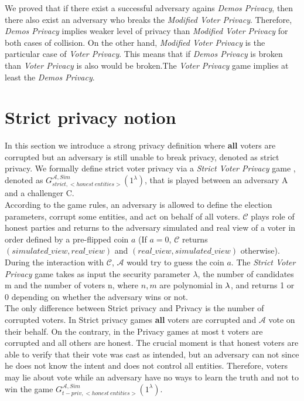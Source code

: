 \documentclass[12pt]{article}
\begin{document}
We proved that if there exist a successful adversary agains \textit{Demos Privacy}, then there also exist an adversary who breaks the \textit{Modified Voter Privacy}. Therefore, \textit{Demos Privacy} implies weaker level of privacy than \textit{Modified Voter Privacy} for both cases of collision. On the other hand, \textit{Modified Voter Privacy} is the particular case of \textit{Voter Privacy}. This means that if \textit{Demos Privacy} is broken than \textit{Voter Privacy} is also would be broken.The \textit{Voter Privacy} game implies at least the \textit{Demos Privacy}.  

%
%
\section{Strict privacy notion}
\label{strict}
In this section we introduce a strong privacy definition where \textbf{all} voters are corrupted but an adversary is still unable to break privacy, denoted as strict privacy. We formally define strict voter privacy via a \textit{Strict Voter Privacy} game , denoted as $G_{strict,<honest~entities>}^{\mathcal{A}, Sim}(1^{\lambda})$,  that is played between an adversary A and a challenger C.\\

According to the game rules, an adversary is allowed to define the election parameters, corrupt some entities, and act on behalf of all voters.  $\mathcal{C}$ plays role of honest parties and returns to the adversary simulated and real view of a voter in order defined by a pre-flipped coin $a$ (If $a=0$, $\mathcal{C}$ returns $(simulated\_view,real\_view)$ and  $(real\_view,simulated\_view)$ otherwise). During the interaction with  $\mathcal{C}$,  $\mathcal{A}$ would try to guess the coin $a$. The \textit{Strict Voter Privacy} game takes as input the security parameter $\lambda$, the number of candidates m and the number of voters n, where $n,m$ are polynomial in $\lambda$, and returns 1 or 0 depending on whether the adversary wins or not.\\

The only difference between Strict privacy and Privacy is the number of corrupted voters. In Strict privacy games \textbf{all} voters are corrupted and  $\mathcal{A}$ vote on their behalf. On the contrary, in the Privacy games at most t voters are corrupted and all others are honest. The crucial moment is that honest voters are able to verify that their vote was cast as intended, but an adversary can not since he does not know the intent and does not control all entities. Therefore, voters may lie about vote while an adversary have no ways to learn the truth and not to win the game $G_{t-priv,<honest~entities>}^{\mathcal{A}, Sim}(1^{\lambda})$. \\
\end{document}
